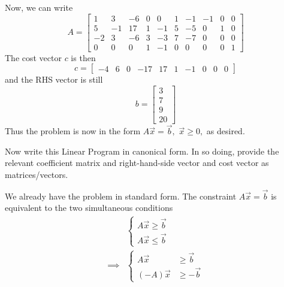 \documentclass{article}
\begin{document}
\begin{itemize}
\begin{enumerate}[a)]
\begin{soln}
				Now, we can write \[A=\begin{bmatrix}
						1 & 3 & -6 & 0 & 0 & 1 & -1 & -1 & 0 & 0 \\
						5 & -1 & 17 & 1 & -1 & 5 & -5 & 0 & 1 & 0 \\
						-2 & 3 & -6 & 3 & -3 & 7 & -7 & 0 & 0 & 0 \\
						0 & 0 & 0 & 1 & -1 & 0 & 0 & 0 & 0 & 1
				\end{bmatrix} \] The cost vector $c$ is then \[c =\begin{bmatrix}
					-4 & 6 & 0 & -17 & 17 & 1 & -1 & 0 & 0 & 0
			\end{bmatrix}\] and the RHS vector is still \[b=\begin{bmatrix}
				3 \\ 7 \\ 9 \\ 20 \end{bmatrix}\] Thus the problem is now in the form $A\vec{x}=\vec{b},$ $\vec{x}\ge 0,$ as desired.

			\end{soln}

		\newpage

			\ii Now write this Linear Program in canonical form. In so doing, provide the relevant coefficient matrix and right-hand-side vector and cost vector as matrices/vectors.
			\begin{soln}
				We already have the problem in standard form. The constraint $A\vec{x}=\vec{b}$ is equivalent to the two simultaneous conditions 
				\begin{align*}
					&\begin{cases}
						A\vec{x}\ge \vec{b} \\
						A\vec{x} \le \vec{b}
					\end{cases} \\
					\implies&\begin{cases}
						A\vec{x} &\ge \vec{b} \\
						(-A)\vec{x} &\ge -\vec{b}
					\end{cases}
				\end{align*}


\end{soln}
\end{enumerate}
\end{itemize}
\end{document}
